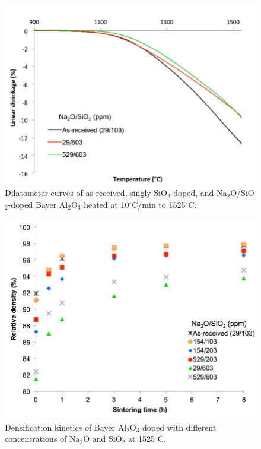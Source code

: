 \newpage
\begin{figure}[H]
	\centering
	\includegraphics[width=\textwidth]{Chapter-3/Figures/Figure5.png}
	\caption{Dilatometer curves of as-received, singly SiO$_{2}$-doped, and Na$_{2}$O/SiO$_{2}$-doped Bayer Al$_{2}$O$_{3}$ heated at 10$^{\circ}$C/min to 1525$^{\circ}$C.}
	\label{Ch3-figure:Figure5}
\end{figure}

\newpage
\begin{figure}[H]
	\centering
	\includegraphics[width=\textwidth]{Chapter-3/Figures/Figure6.png}
	\caption{Densification kinetics of Bayer Al$_{2}$O$_{3}$ doped with different concentrations of Na$_{2}$O and SiO$_{2}$ at 1525$^{\circ}$C.}
	\label{Ch3-figure:Figure6}
\end{figure}


